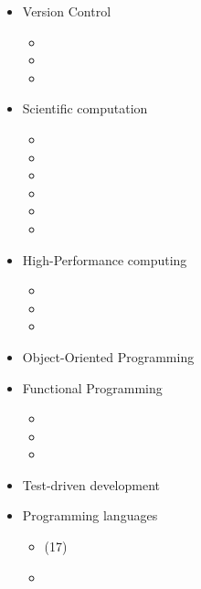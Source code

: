 \documentclass{CurriculumVitae}[10pt, draft, condensed]
\begin{document}
{\begin{multicols}{4}
  \begin{itemize}[topsep=0pt]
    \setlength{\itemsep}{-0.3em}
  \item {\footnotesize Version Control}
    \begin{itemize}[topsep=0pt, partopsep=0pt]
      \setlength{\itemsep}{-0.3em}
    \item {}
    \item {}
    \item {}
    \end{itemize}
  \item {\footnotesize Scientific computation}
    \begin{itemize}[topsep=0pt, partopsep=0pt]
      \setlength{\itemsep}{-0.3em}
    \item {}
    \item {}
    \item {}
    \item {}
    \item {}
    \item {}
    \end{itemize}
  \item {\footnotesize High-Performance computing}
    \begin{itemize}[topsep=0pt, partopsep=0pt]
      \setlength{\itemsep}{-0.3em}
    \item {}
    \item {}
    \item {}
    \end{itemize}
  \item {\footnotesize Object-Oriented Programming}
  \item {\footnotesize Functional Programming}
    \begin{itemize}[topsep=0pt, partopsep=0pt]
      \setlength{\itemsep}{-0.3em}
    \item {}
    \item {}
    \item {}
    \end{itemize}
  \item {\footnotesize Test-driven development}
  \item {\footnotesize Programming languages}
    \begin{itemize}[topsep=0pt, partopsep=0pt]
      \setlength{\itemsep}{-0.3em}
    \item {} (17)
    \item {}

\end{itemize}
\end{itemize}
\end{multicols}}
\end{document}
